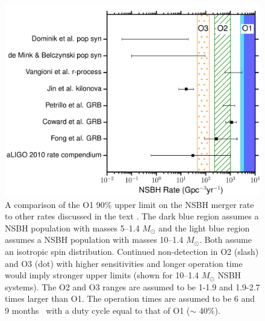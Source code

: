 \begin{figure}[t]
\centering
\includegraphics[width=\textwidth]{figs/chapter3/figure7}
\caption{\label{fig:ratecomparensbh} A comparison of the \ac{O1} 90\% upper limit on
the \ac{NSBH} merger rate to other rates discussed in
the text \protect\citep{Abadie:2010cf, Fong:2015oha, Coward:2012gn,
Petrillo:2012ij, Jin:2015txa, Vangioni:2015ofa, deMink:2015yea, Dominik:2014yma}.
The dark blue region assumes a \ac{NSBH} population with masses 5--1.4 $M_{\odot}$ and the
light blue region assumes a \ac{NSBH} population with masses 10--1.4 $M_{\odot}$.
Both assume an isotropic spin distribution.
Continued non-detection in O2 (slash) and O3 (dot) with higher sensitivities and longer
operation time would imply stronger upper limits (shown for 10--1.4 $M_{\odot}$ \ac{NSBH}
systems).
The O2 and O3 ranges are assumed to be 1-1.9 and 1.9-2.7 times larger than
\ac{O1}.
The operation times are assumed to be 6 and 9 months~\citep{Aasi:2013wya}
with a duty cycle equal to that of \ac{O1} ($\sim$ 40\%).}
\end{figure}

